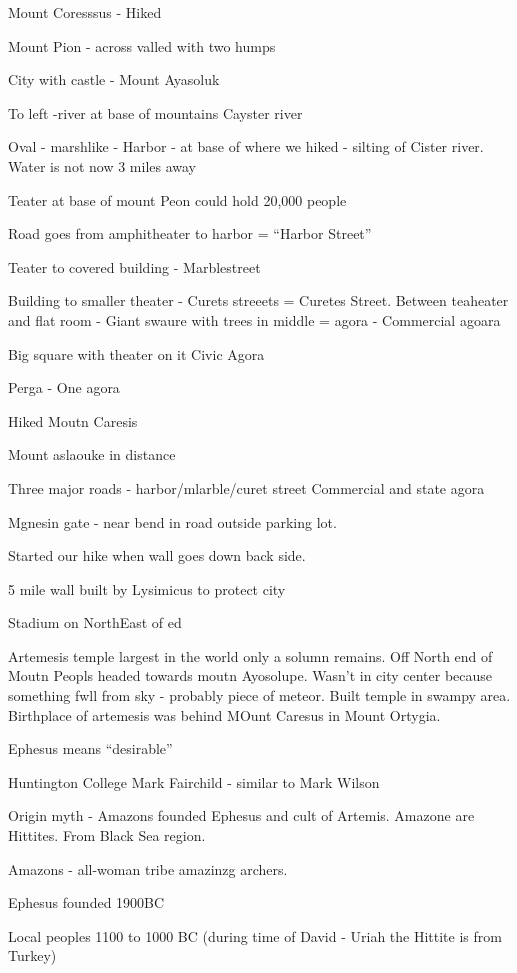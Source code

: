 \documentclass[
]{book}
\begin{document}
Mount Coresssus - Hiked

Mount Pion - across valled with two humps

City with castle - Mount Ayasoluk

To left -river at base of mountains Cayster river

Oval - marshlike - Harbor - at base of where we hiked - silting of Cister river. Water is not now 3 miles away

Teater at base of mount Peon could hold 20,000 people

Road goes from amphitheater to harbor = ``Harbor Street''

Teater to covered building - Marblestreet

Building to smaller theater - Curets streeets = Curetes Street. Between teaheater and flat room - Giant swaure with trees in middle = agora - Commercial agoara

Big square with theater on it Civic Agora

Perga - One agora

Hiked Moutn Caresis

Mount aslaouke in distance

Three major roads - harbor/mlarble/curet street
Commercial and state agora

Mgnesin gate - near bend in road outside parking lot.

Started our hike when wall goes down back side.

5 mile wall built by Lysimicus to protect city

Stadium on NorthEast of ed

Artemesis temple largest in the world only a solumn remains. Off North end of Moutn Peopls headed towards moutn Ayosolupe. Wasn't in city center because something fwll from sky - probably piece of meteor. Built temple in swampy area. Birthplace of artemesis was behind MOunt Caresus in Mount Ortygia.

Ephesus means ``desirable''

Huntington College Mark Fairchild - similar to Mark Wilson

Origin myth - Amazons founded Ephesus and cult of Artemis. Amazone are Hittites. From Black Sea region.

Amazons - all-woman tribe amazinzg archers.

Ephesus founded 1900BC

Local peoples 1100 to 1000 BC (during time of David - Uriah the Hittite is from Turkey)
\end{document}
